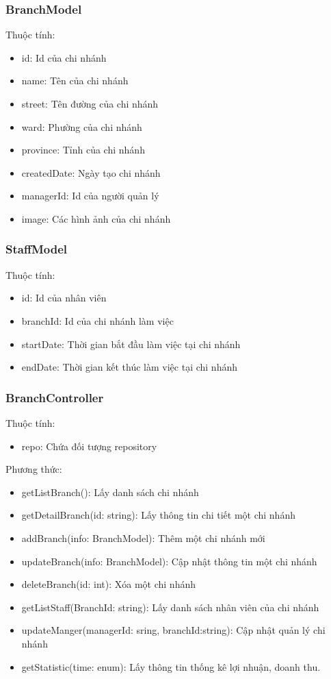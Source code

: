 \subsubsection*{BranchModel}
Thuộc tính:
\begin{itemize}
	\item id: Id của chi nhánh
	\item name: Tên của chi nhánh
	\item street: Tên đường của chi nhánh
	\item ward: Phường của chi nhánh
	\item province: Tỉnh của chi nhánh
	\item createdDate: Ngày tạo chi nhánh
	\item managerId: Id của người quản lý
	\item image: Các hình ảnh của chi nhánh
\end{itemize}

\subsubsection*{StaffModel}
Thuộc tính:
\begin{itemize}
	\item id: Id của nhân viên
	\item branchId: Id của chi nhánh làm việc
	\item startDate: Thời gian bắt đầu làm việc tại chi nhánh
	\item endDate: Thời gian kết thúc làm việc tại chi nhánh
\end{itemize}

\subsubsection*{BranchController}
Thuộc tính:
\begin{itemize}
	\item repo: Chứa đối tượng repository
\end{itemize}
Phương thức:
\begin{itemize}
	\item getListBranch(): Lấy danh sách chi nhánh
	\item getDetailBranch(id: string): Lấy thông tin chi tiết một chi nhánh
	\item addBranch(info: BranchModel): Thêm một chi nhánh mới
	\item updateBranch(info: BranchModel): Cập nhật thông tin một chi nhánh
	\item deleteBranch(id: int): Xóa một chi nhánh
	\item getListStaff(BranchId: string): Lấy danh sách nhân viên của chi nhánh
	\item updateManger(managerId: sring, branchId:string): Cập nhật quản lý chi nhánh
	\item getStatistic(time: enum): Lấy thông tin thống kê lợi nhuận, doanh thu.
\end{itemize}

